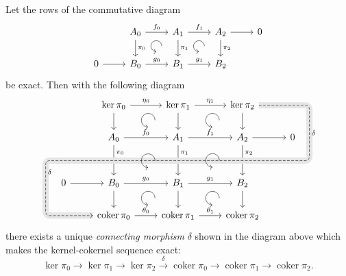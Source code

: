 \documentclass[english,letterpaper]{article}%
\numberwithin{equation}{section}
\numberwithin{figure}{section}
\numberwithin{table}{section}
\theoremstyle{definition}
\theoremstyle{definition}
\theoremstyle{definition}
\theoremstyle{plain}
\theoremstyle{plain}
\theoremstyle{plain}
\theoremstyle{plain}
\theoremstyle{remark}
\theoremstyle{remark}
\DeclareMathOperator{\coker}{coker}
\begin{document}
\begin{lem}\label{snake lemma}
    Let the rows of the commutative diagram
    \[\begin{tikzcd}[every matrix/.append style={name=m},   
        execute at end picture={\draw [<-] ([xshift=-8mm,yshift=-10mm]m-1-3.north) arc[start angle=-90,delta angle=-270,radius=0.2cm];
        \draw [<-] ([xshift=-8mm,yshift=-10mm]m-1-4.north) arc[start angle=-90,delta angle=-270,radius=0.2cm];}]
        & A_0\arrow[r,"f_0"]\arrow[d,"\pi_0"] & A_1 \arrow[r,"f_1"]\arrow[d,"\pi_1"] & A_2\arrow[d,"\pi_2"]\arrow[r] & 0\\
       0\arrow[r] & B_0\arrow[r,"g_0"] & B_1\arrow[r,"g_1"] &B_2 & 
    \end{tikzcd}\]
    be exact. Then with the following diagram
    \[\begin{tikzcd}[background color=gray!20,every matrix/.append style={name=m},   
        execute at end picture={\draw [<-] ([xshift=-11mm,yshift=1mm]m-2-4.north) arc[start angle=-90,delta angle=-270,radius=0.25cm];
        \draw [<-] ([xshift=-11mm,yshift=-3mm]m-3-4.north) arc[start angle=-90,delta angle=-270,radius=0.25cm];
        \draw [<-] ([xshift=-11mm,yshift=1mm]m-5-4.north) arc[start angle=-90,delta angle=-270,radius=0.25cm];
        \draw [<-] ([xshift=-11mm,yshift=1mm]m-2-5.north) arc[start angle=-90,delta angle=-270,radius=0.25cm];
        \draw [<-] ([xshift=-11mm,yshift=3mm]m-4-5.north) arc[start angle=-90,delta angle=-270,radius=0.25cm];
        \draw [<-] ([xshift=-11mm,yshift=1mm]m-5-5.north) arc[start angle=-90,delta angle=-270,radius=0.25cm];}]
        & & \ker \pi_0 \ar{r}{\eta_0} \ar{d} & \ker \pi_1\ar{r}{\eta_1} \ar{d} &  \ker \pi_2 \ar{d}   %
        & & \\
        &  &  A_0 \ar{r}{f_0} \ar{dd}[near start]{\pi_0} & A_1 \ar{r}{f_1} \ar{dd}[near start]{\pi_1} &  A_2\ar{r}\ar{dd}[near start]{\pi_2} & 0 &  ~\\[-1mm]
        & & &  ~ & & \ar[r, phantom, ""{coordinate, name=Y}] & ~\\[-3mm]
        ~&  \ar[l, phantom, ""{coordinate, name=Z}] 0 \ar{r} &  B_0 \ar{r}{g_0} \ar{d} &  B_1 \ar{r}{g_1} \ar{d} &  B_2 \ar{d} & &  \\
              & &  \ar[from=uuuurr, "\delta", dashed,crossing over, rounded corners,
                      to path=
                              { -- ([xshift=2ex]\tikztostart.east)
                              -| (Y) [near end]\tikztonodes
                              -| (Z) [near end]\tikztonodes
                              |- ([xshift=-2ex]\tikztotarget.west)
                               -- (\tikztotarget)}
                    ] \coker \pi_0\ar{r}{\theta_0}
               &  \coker \pi_1 \ar{r}{\theta_1}
               &  \coker \pi_2
               & 
               & 
    \end{tikzcd}\]
    there exists a unique \emph{connecting morphism} $\delta$ shown in the diagram above which makes the kernel-cokernel sequence exact:
    \[\ker\pi_0 \to \ker\pi_1\to\ker\pi_2 \overset\delta\longrightarrow \coker\pi_0\to \coker\pi_1\to\coker\pi_2.\]


\end{lem}
\end{document}
